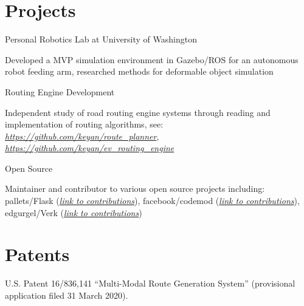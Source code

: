 \documentclass[letterpaper,hidelinks]{scrartcl}
\begin{document}
\section*{Projects}
\begin{list1}
\item \begin{tabular1bold} Personal Robotics Lab at University of Washington \end{tabular1bold}
Developed a MVP simulation environment in Gazebo/ROS for an autonomous robot feeding arm, researched methods for deformable object simulation

\item \begin{tabular1bold} Routing Engine Development \end{tabular1bold}
Independent study of road routing engine systems through reading and implementation of routing algorithms, see: \href{https://github.com/keyan/route\_planner}{\emph{https://github.com/keyan/route\_planner}}, \href{https://github.com/keyan/ev\_routing\_engine}{\emph{https://github.com/keyan/ev\_routing\_engine}}

\item \begin{tabular1bold} Open Source \end{tabular1bold}
Maintainer and contributor to various open source projects including: pallets/Flask (\href{https://github.com/pallets/flask/commits?author=keyan}{\emph{link to contributions}}),  facebook/codemod (\href{https://github.com/facebook/codemod/commits?author=keyan}{\emph{link to contributions}}), edgurgel/Verk (\href{https://github.com/edgurgel/verk/commits?author=keyan}{\emph{link to contributions}})
\end{list1}

%
%

\section*{Patents}

\begin{list1}
\item U.S. Patent 16/836,141 “Multi-Modal Route Generation System” (provisional application filed 31 March 2020).
\end{list1}

%
%
\end{document}
